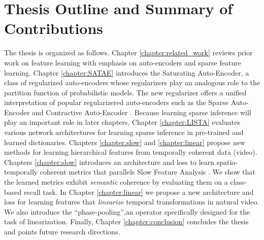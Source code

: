 \section{Thesis Outline and Summary of Contributions} 

The thesis is organized as follows. Chapter \ref{chapter:related_work} reviews
prior work on feature learning with emphasis on auto-encoders and sparse
feature learning.  Chapter \ref{chapter:SATAE} introduces the Saturating
Auto-Encoder, a class of regularized auto-encoders whose regularizers play an
analogous role to the partition function of probabilistic models. The new
regularizer offers a unified interpretation of popular regularizered
auto-encoders such as the Sparse Auto-Encoder and Contractive Auto-Encoder
\cite{SAE,CAE}. Because learning sparse inference will play an important role
in later chapters, Chapter \ref{chapter:LISTA} evaluates various network
architectures for learning sparse inference in pre-trained and learned
dictionaries. Chapters \ref{chapter:slow} and \ref{chapter:linear} propose new
methods for learning hierarchical features from temporally coherent data
(video).        Chapters \ref{chapter:slow} introduces an architecture and loss
to learn spatio-temporally coherent metrics that parallels Slow Feature
Analysis \cite{SFA}. We show that the learned metrics exhibit \emph{semantic}
coherence by evaluating them on a class-based recall task. In Chapter
\ref{chapter:linear} we propose a new architecture and loss for learning
features that \emph{linearize} temporal transformations in natural video. We
also introduce the ``phase-pooling'',an operator specifically designed for the
task of linearization.  Finally, Chapter \ref{chapter:conclusion} concludes the
thesis and points future research directions. 






